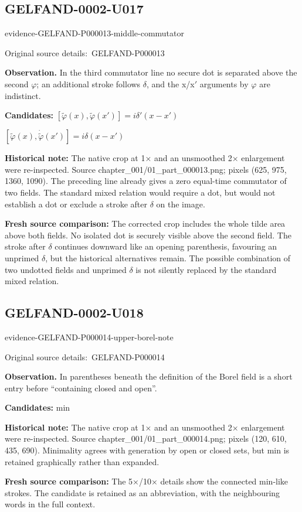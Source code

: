 \documentclass[11pt]{article}
\newcommand{\EvidenceBlock}[4]{%
 \par\smallskip\noindent\begin{minipage}{\linewidth}
 \begin{minipage}[t]{.47\linewidth}\vspace{0pt}\centering
 \csname evidence-#1-#2\endcsname\par
 {\scriptsize\SourceCropCaption\ #1}\par
 \end{minipage}\hfill
 \begin{minipage}[t]{.49\linewidth}\vspace{0pt}\raggedright
 {\small\color{orange!65!black}\textbf{#4} #3}\par
 \end{minipage}
 \end{minipage}\par\smallskip}
\newcommand{\SourceCropCaption}{Original source details:}\newcommand{\ReadingCaption}{Uncertain reading.}\newcommand{\IncompleteCaption}{Undeciphered passage.}\newcommand{\DiagramCaption}{Diagram and typed description.}
\begin{document}
\subsection*{GELFAND-0002-U017}
\EvidenceBlock{GELFAND-P000013}{middle-commutator}{In the third commutator line no secure dot is separated above the second \(\varphi\); an additional stroke follows \(\delta\), and the x/x\(\prime\) arguments by \(\varphi\) are indistinct.}{Observation.}
\par\smallskip\noindent\textbf{Candidates: } \([\widetilde\varphi(x),\widetilde\varphi(x')]=i\delta'(x-x')\)\par\smallskip\([\widetilde\varphi(x),\dot{\widetilde\varphi}(x')]=i\delta(x-x')\)\par
\par\smallskip\noindent\textbf{Historical note: } The native crop at 1× and an unsmoothed 2× enlargement were re-inspected. Source chapter\_001/01\_part\_000013.png; pixels (625, 975, 1360, 1090). The preceding line already gives a zero equal-time commutator of two fields. The standard mixed relation would require a dot, but would not establish a dot or exclude a stroke after \(\delta\) on the image.\par
\par\smallskip\noindent\textbf{Fresh source comparison: } The corrected crop includes the whole tilde area above both fields. No isolated dot is securely visible above the second field. The stroke after \(\delta\) continues downward like an opening parenthesis, favouring an unprimed \(\delta\), but the historical alternatives remain. The possible combination of two undotted fields and unprimed \(\delta\) is not silently replaced by the standard mixed relation.\par

\subsection*{GELFAND-0002-U018}
\EvidenceBlock{GELFAND-P000014}{upper-borel-note}{In parentheses beneath the definition of the Borel field is a short entry before “containing closed and open”.}{Observation.}
\par\smallskip\noindent\textbf{Candidates: } min\par
\par\smallskip\noindent\textbf{Historical note: } The native crop at 1× and an unsmoothed 2× enlargement were re-inspected. Source chapter\_001/01\_part\_000014.png; pixels (120, 610, 435, 690). Minimality agrees with generation by open or closed sets, but min is retained graphically rather than expanded.\par
\par\smallskip\noindent\textbf{Fresh source comparison: } The 5×/10× details show the connected min-like strokes. The candidate is retained as an abbreviation, with the neighbouring words in the full context.\par
\end{document}
